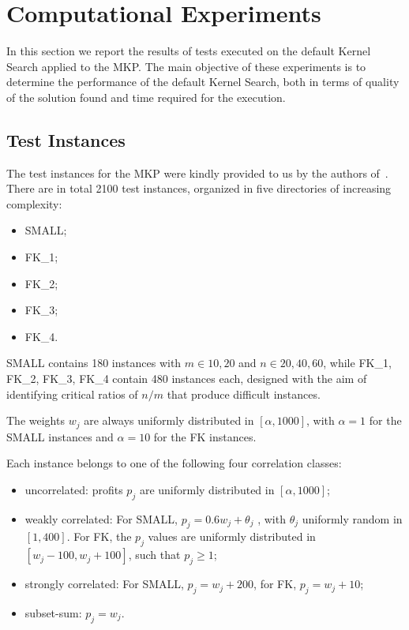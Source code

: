 \chapter{Computational Experiments}\label{ch:computational-experiments}
In this section we report the results of tests executed on the default Kernel Search applied to the MKP\@.
The main objective of these experiments is to determine the performance of the default Kernel Search,
both in terms of quality of the solution found and time required for the execution.


\section{Test Instances}
The test instances for the MKP were kindly provided to us by the authors of~\cite{mkp:2019}.\\
There are in total 2100 test instances, organized in
five directories of increasing complexity:
\begin{itemize}
    \item SMALL;
    \item FK\_1;
    \item FK\_2;
    \item FK\_3;
    \item FK\_4.
\end{itemize}
SMALL contains 180 instances with \(m \in {10,20} \) and
\(n \in {20,40,60}\), while FK\_1, FK\_2, FK\_3, FK\_4 contain 480
instances each, designed with the aim of identifying critical ratios of
\(n/m\) that produce difficult instances.

The weights \(w_{j}\) are always uniformly distributed in \([\alpha, 1000]\), with \(\alpha = 1\) for the
SMALL instances and \(\alpha = 10\) for the FK instances.

Each instance belongs to one of the following four correlation classes:
\begin{itemize}
    \item uncorrelated: profits \(p_{j}\) are uniformly distributed in \([\alpha,1000]\);
    \item weakly correlated: For SMALL, \(p_{j} = 0.6 w_{j} + \theta_{j}\) , with \(\theta_{j}\) uniformly random in
    \([1, 400]\). For FK, the \(p_{j}\) values are uniformly distributed in \([w_{j} - 100, w_{j} + 100]\), such that
    \(p_{j} \geq 1\);
    \item strongly correlated: For SMALL, \(p_{j} = w_{j} + 200\), for FK, \(p_{j} = w_{j} + 10\);
    \item subset-sum: \(p_{j} = w_{j}\).
\end{itemize}

